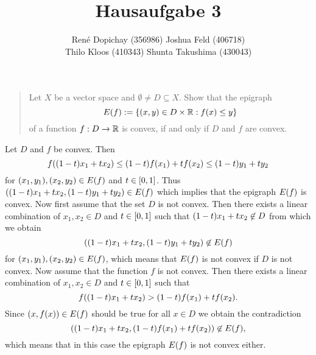 \documentclass{exercise}
\title{Hausaufgabe 3}
\author{René Dopichay (356986) \quad Joshua Feld (406718)\\Thilo Kloos (410343) \quad Shunta Takushima (430043)}
\begin{document}
	\maketitle


	\section{}

	\begin{quote}
		Let \(X\) be a vector space and \(\emptyset \ne D \subseteq X\).
		Show that the epigraph
		\[
			E\parentheses*{f} := \braces*{\parentheses*{x, y} \in D \times \R : f\parentheses*{x} \le y}
		\]
		of a function \(f: D \to \R\) is convex, if and only if \(D\) and \(f\) are convex.
	\end{quote}

	Let \(D\) and \(f\) be convex.
	Then
	\[
		f\parentheses*{\parentheses*{1 - t}x_1 + tx_2} \le \parentheses*{1 - t}f\parentheses*{x_1} + tf\parentheses*{x_2} \le \parentheses*{1 - t}y_1 + ty_2
	\]
	for \(\parentheses*{x_1, y_1}, \parentheses*{x_2, y_2} \in E\parentheses*{f}\) and \(t \in \brackets*{0, 1}\).
	Thus \(\parentheses*{\parentheses*{1 - t}x_1 + tx_2, \parentheses*{1 - t}y_1 + ty_2} \in E\parentheses*{f}\) which implies that the epigraph \(E\parentheses*{f}\) is convex.
	Now first assume that the set \(D\) is not convex.
	Then there exists a linear combination of \(x_1, x_2 \in D\) and \(t \in \brackets*{0, 1}\) such that \(\parentheses*{1 - t}x_1 + tx_2 \not\in D\) from which we obtain
	\[
		\parentheses*{\parentheses*{1 - t}x_1 + tx_2, \parentheses*{1 - t}y_1 + ty_2} \not\in E\parentheses*{f}
	\]
	for \(\parentheses*{x_1, y_1}, \parentheses*{x_2, y_2} \in E\parentheses*{f}\), which means that \(E\parentheses*{f}\) is not convex if \(D\) is not convex.
	Now assume that the function \(f\) is not convex.
	Then there exists a linear combination of \(x_1, x_2 \in D\) and \(t \in \brackets*{0, 1}\) such that
	\[
		f\parentheses*{\parentheses*{1 - t}x_1 + tx_2} > \parentheses*{1 - t}f\parentheses*{x_1} + tf\parentheses*{x_2}.
	\]
	Since \(\parentheses*{x, f\parentheses*{x}} \in E\parentheses*{f}\) should be true for all \(x \in D\) we obtain the contradiction
	\[
		\parentheses*{\parentheses*{1 - t}x_1 + tx_2, \parentheses*{1 - t}f\parentheses*{x_1} + tf\parentheses*{x_2}} \not\in E\parentheses*{f},
	\]
	which means that in this case the epigraph \(E\parentheses*{f}\) is not convex either.


	\section{}
\end{document}
